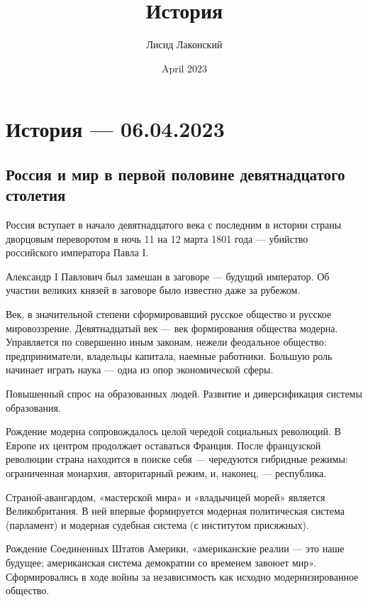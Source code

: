 \documentclass{article}
\title{История}
\author{Лисид Лаконский}
\date{April 2023}
\begin{document}
\raggedright

\maketitle
\tableofcontents
\pagebreak

\section{История — 06.04.2023}

\subsection{Россия и мир в первой половине девятнадцатого столетия}

Россия вступает в начало девятнадцатого века с последним в истории страны дворцовым переворотом в ночь 11 на 12 марта 1801 года — убийство российского императора Павла I.

Александр I Павлович был замешан в заговоре — будущий император. Об участии великих князей в заговоре было известно даже за рубежом.

\hfill

Век, в значительной степени сформировавший русское общество и русское мировоззрение. Девятнадцатый век — век формирования общества модерна. Управляется по совершенно иным законам, нежели феодальное общество: предприниматели, владельцы капитала, наемные работники. Большую роль начинает играть наука — одна из опор экономической сферы.

Повышенный спрос на образованных людей. Развитие и диверсификация системы образования.

Рождение модерна сопровождалось целой чередой социальных революций. В Европе их центром продолжает оставаться Франция. После французской революции страна находится в поиске себя — чередуются гибридные режимы: ограниченная монархия, авторитарный режим, и, наконец, — республика.

Страной-авангардом, «мастерской мира» и «владычицей морей» является Великобритания. В ней впервые формируется модерная политическая система (парламент) и модерная судебная система (с институтом присяжных).

\hfill

Рождение Соединенных Штатов Америки, «американские реалии — это наше будущее; американская система демократии со временем завоюет мир». Сформировались в ходе войны за независимость как исходно модернизированное общество.
\end{document}
